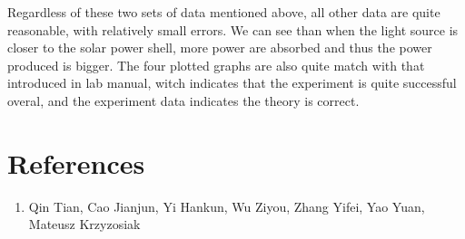 \documentclass[12pt, a4paper]{article}
\begin{document}
Regardless of these two sets of data mentioned above, all other data are quite reasonable, with relatively small errors. We can see 
than when the light source is closer to the solar power shell, more power are absorbed and thus the power produced is bigger. The four 
plotted graphs are also quite match with that introduced in lab manual, witch indicates that the experiment is quite successful overal, 
and the experiment data indicates the theory is correct.

\section{References}
    \begin{enumerate}
        \item Qin Tian, Cao Jianjun, Yi Hankun, Wu Ziyou, Zhang Yifei, Yao Yuan, Mateusz Krzyzosiak
    \end{enumerate}
\end{document}
